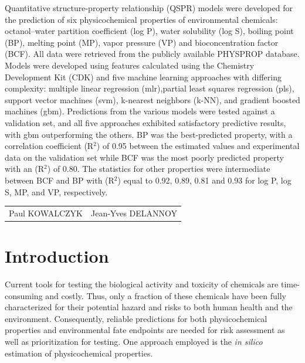 \documentclass[10pt, letter]{article}
\renewcommand{\=}{\, =\, }
\newcommand{\+}{\, +\, }
\renewcommand{\-}{\, -\, }
\begin{document}
Quantitative structure-property relationship (QSPR) models were developed for the
prediction of six physicochemical properties of environmental chemicals: octanol–water
partition coefficient (log P), water solubility (log S), boiling point (BP), melting point (MP),
vapor pressure (VP) and bioconcentration factor (BCF). All data were retrieved from the publicly available PHYSPROP database. Models were developed using
features calculated using the Chemistry Development Kit (CDK) and five machine learning approaches with differing complexity: multiple
linear regression (mlr),partial least squares regression (pls), support vector machines (svm), k-nearest neighbors (k-NN), and gradient boosted machines (gbm). Predictions from the various models were tested
against a validation set, and all five approaches exhibited satisfactory predictive results, with
gbm outperforming the others. BP was the best-predicted property, with a correlation
coefficient (R\(^{2}\)) of 0.95 between the estimated values and experimental data on the
validation set while BCF was the most poorly predicted property with an (R\(^{2}\)) of 0.80. The
statistics for other properties were intermediate between BCF and BP with (R\(^{2}\)) equal to 0.92,
0.89, 0.81 and 0.93 for log P, log S, MP, and VP, respectively.  

\vspace*{1cm}
\begin{tabular*}{5.03\textwidth}{lr}
Paul KOWALCZYK &\hspace*{9cm} Jean-Yves DELANNOY\\
\end{tabular*}

\newpage

\tableofcontents

\newpage

\section{Introduction}

Current tools for testing the biological activity and toxicity of chemicals are
time-consuming and costly. Thus, only a fraction of these chemicals have been
fully characterized for their potential hazard and risks to both human health and
the environment. Consequently, 
reliable predictions for both physicochemical properties and environmental fate endpoints are needed for risk assessment as well as
prioritization for testing. One approach employed is the \textit{in silico} estimation of physicochemical properties.
\end{document}
